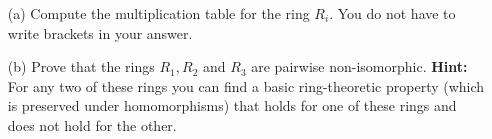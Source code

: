 \documentclass[11pt]{amsart}
\begin{document}
\begin{itemize}
\item[(a)] Compute the multiplication table for the ring $R_i$. You do not have to write brackets in your answer.
\item[(b)] Prove that the rings $R_1,R_2$ and $R_3$ are pairwise non-isomorphic. {\bf Hint:} For any two of these rings you can find a basic ring-theoretic property (which is preserved under homomorphisms) that holds for one of these rings and does not hold for the other.
\end{itemize}
\end{document}
